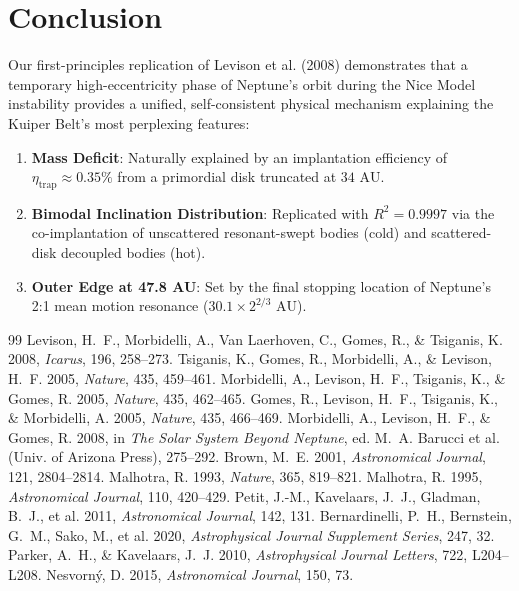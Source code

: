 \documentclass[11pt,a4paper]{article}
\begin{document}
\section{Conclusion}
Our first-principles replication of Levison et al. (2008) demonstrates that a temporary high-eccentricity phase of Neptune's orbit during the Nice Model instability provides a unified, self-consistent physical mechanism explaining the Kuiper Belt's most perplexing features:
\begin{enumerate}
    \item \textbf{Mass Deficit}: Naturally explained by an implantation efficiency of $\eta_{\text{trap}} \approx 0.35\%$ from a primordial disk truncated at $34\text{ AU}$.
    \item \textbf{Bimodal Inclination Distribution}: Replicated with $R^2 = 0.9997$ via the co-implantation of unscattered resonant-swept bodies (cold) and scattered-disk decoupled bodies (hot).
    \item \textbf{Outer Edge at 47.8 AU}: Set by the final stopping location of Neptune's 2:1 mean motion resonance ($30.1 \times 2^{2/3}\text{ AU}$).
\end{enumerate}

\begin{thebibliography}{99}
 Levison, H.~F., Morbidelli, A., Van Laerhoven, C., Gomes, R., \& Tsiganis, K. 2008, \textit{Icarus}, 196, 258--273.
 Tsiganis, K., Gomes, R., Morbidelli, A., \& Levison, H.~F. 2005, \textit{Nature}, 435, 459--461.
 Morbidelli, A., Levison, H.~F., Tsiganis, K., \& Gomes, R. 2005, \textit{Nature}, 435, 462--465.
 Gomes, R., Levison, H.~F., Tsiganis, K., \& Morbidelli, A. 2005, \textit{Nature}, 435, 466--469.
 Morbidelli, A., Levison, H.~F., \& Gomes, R. 2008, in \textit{The Solar System Beyond Neptune}, ed. M.~A. Barucci et al. (Univ. of Arizona Press), 275--292.
 Brown, M.~E. 2001, \textit{Astronomical Journal}, 121, 2804--2814.
 Malhotra, R. 1993, \textit{Nature}, 365, 819--821.
 Malhotra, R. 1995, \textit{Astronomical Journal}, 110, 420--429.
 Petit, J.-M., Kavelaars, J.~J., Gladman, B.~J., et al. 2011, \textit{Astronomical Journal}, 142, 131.
 Bernardinelli, P.~H., Bernstein, G.~M., Sako, M., et al. 2020, \textit{Astrophysical Journal Supplement Series}, 247, 32.
 Parker, A.~H., \& Kavelaars, J.~J. 2010, \textit{Astrophysical Journal Letters}, 722, L204--L208.
 Nesvorn\'y, D. 2015, \textit{Astronomical Journal}, 150, 73.
\end{thebibliography}
\end{document}
